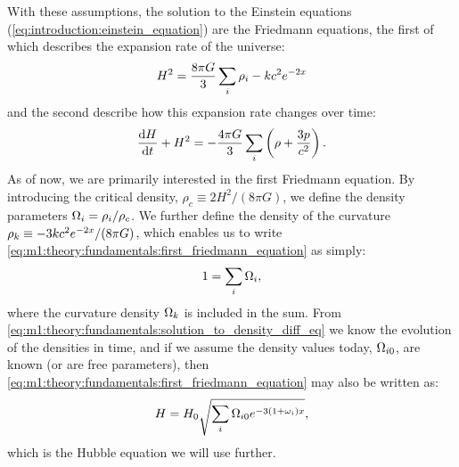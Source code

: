     With these assumptions, the solution to the Einstein equations (\cref{eq:introduction:einstein_equation}) are the Friedmann equations, the first of which describes the expansion rate of the universe:
    \begin{equation}
        \label{eq:m1:theory:fundamentals:first_friedmann_equation}
        H^2 = \frac{8\pi G}{3}\sum_i\rho_i - kc^2e^{-2x} \\
    \end{equation}
    and the second describe how this expansion rate changes over time:
    \begin{equation}
        \label{eq:m1:theory:fundamentals:second_friedmann_equation}
        \dv{H}{t}+H^2 = -\frac{4\pi G}{3}\sum_i\left(\rho+\frac{3p}{c^2}\right).
    \end{equation}
    As of now, we are primarily interested in the first Friedmann equation. By introducing the critical density, $\rho_c\equiv2H^2/(8\pi G)$, we define the density parameters $\Omega_i=\rho_i/\rho_c$. We further define the density of the curvature $\rho_k\equiv-3kc^2e^{-2x}/(8\pi G)$, which enables us to write \cref{eq:m1:theory:fundamentals:first_friedmann_equation} as simply:
    \begin{equation}
        1=\sum_i\Omega_i,
    \end{equation}
    where the curvature density $\Omega_k$ is included in the sum. From \cref{eq:m1:theory:fundamentals:solution_to_density_diff_eq} we know the evolution of the densities in time, and if we assume the density values today, $\Omega_{i0}$, are known (or are free parameters), then \cref{eq:m1:theory:fundamentals:first_friedmann_equation} may also be written as:
    \begin{equation}\label{eq:m1:theory:fundamentals:Hubble_equation}
        H = H_0\sqrt{\sum_i\Omega_{i0}e^{-3(1+\omega_i)x}},
    \end{equation}
    which is the Hubble equation we will use further.





